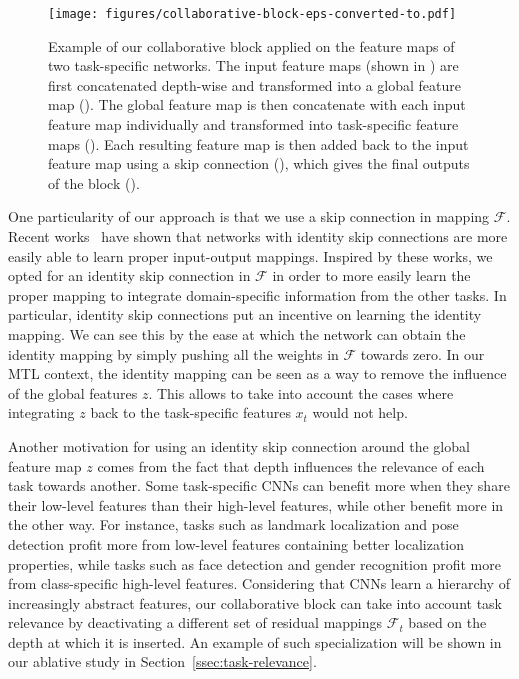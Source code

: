 \documentclass[runningheads]{llncs}
\newcommand{\numcircled}[1]{\raisebox{.5pt}{\textcircled{\raisebox{-.9pt} {#1}}}}
\newcommand{\citep}{\cite}
\begin{document}
\begin{figure}[t]
    \centering
    \texttt{[image: figures/collaborative-block-eps-converted-to.pdf]}
    \caption{Example of our collaborative block applied on the feature maps of two task-specific networks. The input feature maps (shown in \numcircled{1}) are first concatenated depth-wise and transformed into a global feature map (\numcircled{2}). The global feature map is then concatenate with each input feature map individually and transformed into task-specific feature maps (\numcircled{3}). Each resulting feature map is then added back to the input feature map using a skip connection (\numcircled{4}), which gives the final outputs of the block (\numcircled{5}).}
    \label{fig:collaborative-block}
\end{figure}

One particularity of our approach is that we use a skip connection in mapping $\mathcal{F}$. Recent works~\citep{he2016identity}\citep{he2016deep}\citep{huang2016deep}\citep{xie2017aggregated}\citep{veit2016residual} have shown that networks with identity skip connections are more easily able to learn proper input-output mappings. Inspired by these works, we opted for an identity skip connection in $\mathcal{F}$ in order to more easily learn the proper mapping to integrate domain-specific information from the other tasks. In particular, identity skip connections put an incentive on learning the identity mapping. We can see this by the ease at which the network can obtain the identity mapping by simply pushing all the weights in $\mathcal{F}$ towards zero. In our MTL context, the identity mapping can be seen as a way to remove the influence of the global features $z$. This allows to take into account the cases where integrating $z$ back to the task-specific features $x_t$ would not help.

Another motivation for using an identity skip connection around the global feature map $z$ comes from the fact that depth influences the relevance of each task towards another. Some task-specific CNNs can benefit more when they share their low-level features than their high-level features, while other benefit more in the other way. For instance, tasks such as landmark localization and pose detection profit more from low-level features containing better localization properties, while tasks such as face detection and gender recognition profit more from class-specific high-level features. Considering that CNNs learn a hierarchy of increasingly abstract features, our collaborative block can take into account task relevance by deactivating a different set of residual mappings $\mathcal{F}_t$ based on the depth at which it is inserted. An example of such specialization will be shown in our ablative study in Section~\ref{ssec:task-relevance}.
\end{document}
